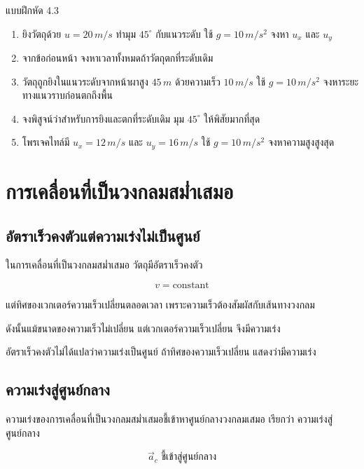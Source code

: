 \begin{exercisebox}{แบบฝึกหัด 4.3}
\begin{enumerate}
    \item ยิงวัตถุด้วย $u=20\,\si{m/s}$ ทำมุม $45^\circ$ กับแนวระดับ ใช้ $g=10\,\si{m/s^2}$ จงหา $u_x$ และ $u_y$
    \item จากข้อก่อนหน้า จงหาเวลาทั้งหมดถ้าวัตถุตกที่ระดับเดิม
    \item วัตถุถูกยิงในแนวระดับจากหน้าผาสูง $45\,\si{m}$ ด้วยความเร็ว $10\,\si{m/s}$ ใช้ $g=10\,\si{m/s^2}$ จงหาระยะทางแนวราบก่อนตกถึงพื้น
    \item จงพิสูจน์ว่าสำหรับการยิงและตกที่ระดับเดิม มุม $45^\circ$ ให้พิสัยมากที่สุด
    \item โพรเจคไทล์มี $u_x=12\,\si{m/s}$ และ $u_y=16\,\si{m/s}$ ใช้ $g=10\,\si{m/s^2}$ จงหาความสูงสูงสุด
\end{enumerate}
\end{exercisebox}

\section{การเคลื่อนที่เป็นวงกลมสม่ำเสมอ}

\subsection{อัตราเร็วคงตัวแต่ความเร่งไม่เป็นศูนย์}

ในการเคลื่อนที่เป็นวงกลมสม่ำเสมอ วัตถุมีอัตราเร็วคงตัว

\[
v=\text{constant}
\]

แต่ทิศของเวกเตอร์ความเร็วเปลี่ยนตลอดเวลา เพราะความเร็วต้องสัมผัสกับเส้นทางวงกลม

ดังนั้นแม้ขนาดของความเร็วไม่เปลี่ยน แต่เวกเตอร์ความเร็วเปลี่ยน จึงมีความเร่ง

\begin{tcolorbox}[title=จุดสำคัญ]
อัตราเร็วคงตัวไม่ได้แปลว่าความเร่งเป็นศูนย์ ถ้าทิศของความเร็วเปลี่ยน แสดงว่ามีความเร่ง
\end{tcolorbox}

\subsection{ความเร่งสู่ศูนย์กลาง}

ความเร่งของการเคลื่อนที่เป็นวงกลมสม่ำเสมอชี้เข้าหาศูนย์กลางวงกลมเสมอ เรียกว่า ความเร่งสู่ศูนย์กลาง

\[
\vec{a}_c \text{ ชี้เข้าสู่ศูนย์กลาง}
\]

